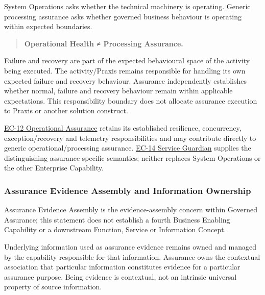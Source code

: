 System Operations asks whether the technical machinery is operating. Generic processing assurance asks whether governed business behaviour is operating within expected boundaries.

\label{rad:enabling:722}

\begin{quote}

\textbf{Operational Health ≠ Processing Assurance.}


\end{quote}
\label{rad:enabling:724}

Failure and recovery are part of the expected behavioural space of the activity being executed. The activity/\allowbreak{}Praxis remains responsible for handling its own expected failure and recovery behaviour. Assurance independently establishes whether normal, failure and recovery behaviour remain within applicable expectations. This responsibility boundary does not allocate assurance execution to Praxis or another solution construct.

\label{rad:enabling:726}

\hyperref[rad:enterprise:202]{EC-12 Operational Assurance} retains its established resilience, concurrency, exception/\allowbreak{}recovery and telemetry responsibilities and may contribute directly to generic operational/\allowbreak{}processing assurance. \hyperref[rad:enterprise:224]{EC-14 Service Guardian} supplies the distinguishing assurance-specific semantics; neither replaces System Operations or the other Enterprise Capability.

\label{rad:enabling:728}
\subsubsection*{Assurance Evidence Assembly and Information Ownership}
\label{rad:enabling:730}

Assurance Evidence Assembly is the evidence-assembly concern within Governed Assurance; this statement does not establish a fourth Business Enabling Capability or a downstream Function, Service or Information Concept.

\label{rad:enabling:732}

Underlying information used as assurance evidence remains owned and managed by the capability responsible for that information. Assurance owns the contextual association that particular information constitutes evidence for a particular assurance purpose. Being evidence is contextual, not an intrinsic universal property of source information.

